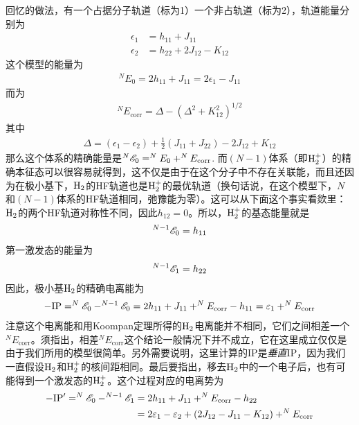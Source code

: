 回忆的做法，有一个占据分子轨道（标为1）一个非占轨道（标为2），轨道能量分别为
\begin{subequations}
	\begin{align}
	\epsilon_1 & = h_{11} + J_{11}\\
	\epsilon_2 & = h_{22} + 2J_{12} - K_{12}
	\end{align}
\end{subequations}
这个模型的能量为
\begin{align}
^NE_0 = 2h_{11} + J_{11} = 2\epsilon_1 - J_{11}
\end{align}
而为
\begin{align}
^NE_\mathrm{corr} = \Delta - (\Delta^2 + K_{12}^2)^{1/2}
\end{align}
其中
\begin{align}
\Delta = (\epsilon_1 - \epsilon_2) + \frac{1}{2}(J_{11} + J_{22}) - 2J_{12} + K_{12}
\end{align}
那么这个体系的精确能量是$^N\mathscr{E}_0 = ^NE_0 + ^NE_\mathrm{corr}$. 而$(N-1)$体系（即$\mathrm{H}_2^+$）的精确本征态可以很容易就得到，这不仅是由于在这个分子中不存在关联能，而且还因为在极小基下，$\mathrm{H}_2$的HF轨道也是$\mathrm{H}_2^+$的最优轨道（换句话说，在这个模型下，$N$和$(N-1)$体系的HF轨道相同，弛豫能为零）。这可以从下面这个事实看欻里：$\mathrm{H}_2$的两个HF轨道对称性不同，因此$h_{12}=0$。所以，$\mathrm{H}_2^+$的基态能量就是
\begin{align}
^{N-1}\mathscr{E}_0 = h_{11}
\end{align}
第一激发态的能量为
\begin{align}
^{N-1}\mathscr{E}_1 = h_{22}
\end{align}
因此，极小基$\mathrm{H}_2$的精确电离能为
\begin{align}
-\mathrm{IP} = ^{N}\mathscr{E}_0 - ^{N-1}\mathscr{E}_0 = 2h_{11} + J_{11} + ^NE_\mathrm{corr} - h_{11} = \varepsilon_1 + ^NE_\mathrm{corr}
\end{align}
注意这个电离能和用Koompan定理所得的$\mathrm{H}_2$电离能并不相同，它们之间相差一个$^NE_\mathrm{corr}$。须指出，相差$^NE_\mathrm{corr}$这个结论一般情况下并不成立，它在这里成立仅仅是由于我们所用的模型很简单。另外需要说明，这里计算的IP是\emph{垂直}IP，因为我们一直假设$\mathrm{H}_2$和$\mathrm{H}_2^+$的核间距相同。最后要指出，移去$\mathrm{H}_2$中的一个电子后，也有可能得到一个激发态的$\mathrm{H}_2^+$。这个过程对应的电离势为
\begin{align}
-\mathrm{IP}' = ^{N}\mathscr{E}_0 - ^{N-1}\mathscr{E}_1 &=  2h_{11} + J_{11} + ^NE_\mathrm{corr} - h_{22} \notag \\
& = 2\varepsilon_1 -\varepsilon_2 + (2J_{12} - J_{11} - K_{12}) + ^NE_\mathrm{corr} 
\label{7.52b}
\end{align}

